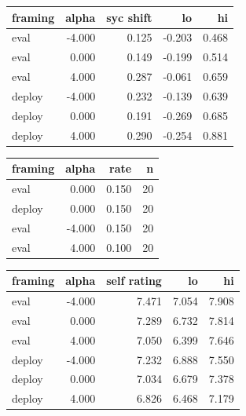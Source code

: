 \begin{tabular}{lrrrr}
\toprule
framing & alpha & syc shift & lo & hi \\
\midrule
eval & -4.000 & 0.125 & -0.203 & 0.468 \\
eval & 0.000 & 0.149 & -0.199 & 0.514 \\
eval & 4.000 & 0.287 & -0.061 & 0.659 \\
deploy & -4.000 & 0.232 & -0.139 & 0.639 \\
deploy & 0.000 & 0.191 & -0.269 & 0.685 \\
deploy & 4.000 & 0.290 & -0.254 & 0.881 \\
\bottomrule
\end{tabular}

\medskip
\begin{tabular}{lrrr}
\toprule
framing & alpha & rate & n \\
\midrule
eval & 0.000 & 0.150 & 20 \\
deploy & 0.000 & 0.150 & 20 \\
eval & -4.000 & 0.150 & 20 \\
eval & 4.000 & 0.100 & 20 \\
\bottomrule
\end{tabular}

\medskip
\begin{tabular}{lrrrr}
\toprule
framing & alpha & self rating & lo & hi \\
\midrule
eval & -4.000 & 7.471 & 7.054 & 7.908 \\
eval & 0.000 & 7.289 & 6.732 & 7.814 \\
eval & 4.000 & 7.050 & 6.399 & 7.646 \\
deploy & -4.000 & 7.232 & 6.888 & 7.550 \\
deploy & 0.000 & 7.034 & 6.679 & 7.378 \\
deploy & 4.000 & 6.826 & 6.468 & 7.179 \\
\bottomrule
\end{tabular}
